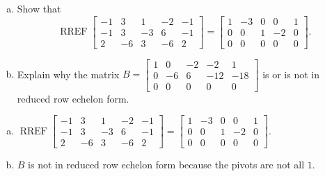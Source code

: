 
\begin{exerciseStatement}

\begin{enumerate}[(a)]
\item Show that \[\operatorname{RREF} \left[\begin{array}{ccccc}
-1 & 3 & 1 & -2 & -1 \\
-1 & 3 & -3 & 6 & -1 \\
2 & -6 & 3 & -6 & 2
\end{array}\right] = \left[\begin{array}{ccccc}
1 & -3 & 0 & 0 & 1 \\
0 & 0 & 1 & -2 & 0 \\
0 & 0 & 0 & 0 & 0
\end{array}\right] .\]
\item Explain why the matrix \(B= \left[\begin{array}{ccccc}
1 & 0 & -2 & -2 & 1 \\
0 & -6 & 6 & -12 & -18 \\
0 & 0 & 0 & 0 & 0
\end{array}\right] \) is or is not in reduced row echelon form.
\end{enumerate}
    
\end{exerciseStatement}
    
\begin{exerciseAnswer} 

\begin{enumerate}[(a)]
\item \(\operatorname{RREF} \left[\begin{array}{ccccc}
-1 & 3 & 1 & -2 & -1 \\
-1 & 3 & -3 & 6 & -1 \\
2 & -6 & 3 & -6 & 2
\end{array}\right] = \left[\begin{array}{ccccc}
1 & -3 & 0 & 0 & 1 \\
0 & 0 & 1 & -2 & 0 \\
0 & 0 & 0 & 0 & 0
\end{array}\right] .\)
\item \(B\) is not in reduced row echelon form because the pivots are not all \(1\). 
\end{enumerate}
    
\end{exerciseAnswer}
    
